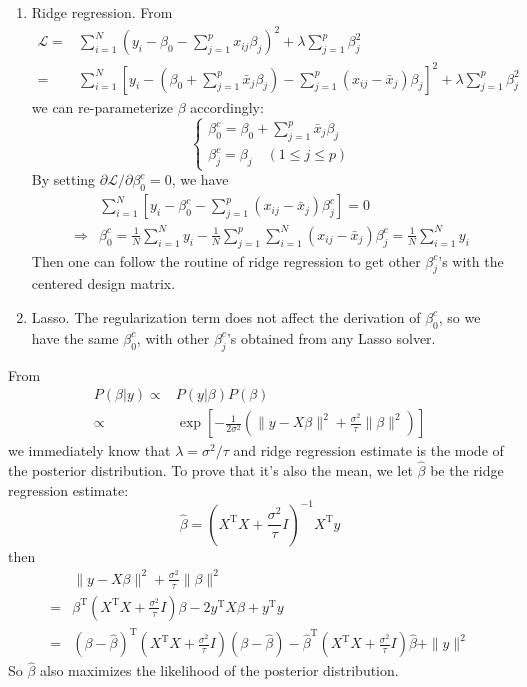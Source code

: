\begin{sol}
\begin{enumerate}
\item Ridge regression. From
\begin{align*}
\mathcal{L} =& \sum_{i=1}^{N}\left(y_i-\beta_0-\sum_{j=1}^{p}x_{ij}\beta_j\right)^2+\lambda\sum_{j=1}^{p}\beta_j^2\\
=& \sum_{i=1}^{N}\left[y_i-\left(\beta_0+\sum_{j=1}^{p}\bar{x}_j\beta_j\right)-\sum_{j=1}^{p}\left(x_{ij}-\bar{x}_j\right)\beta_j\right]^2+\lambda\sum_{j=1}^{p}\beta_j^2
\end{align*}
we can re-parameterize $\beta$ accordingly:
\[
\begin{cases}
\beta_0^c=\beta_0+\sum_{j=1}^{p}\bar{x}_j\beta_j\\
\beta_j^c=\beta_j\quad(1\le j\le p)
\end{cases}
\]
By setting $\partial \mathcal{L}/\partial \beta^c_0=0$, we have
\begin{align*}
& \sum_{i=1}^{N}\left[y_i-\beta_0^c-\sum_{j=1}^{p}\left(x_{ij}-\bar{x}_j\right)\beta^c_j\right]=0\\
\Longrightarrow & \beta_0^c=\frac{1}{N}\sum_{i=1}^{N}y_i-\frac{1}{N}\sum_{j=1}^{p}\sum_{i=1}^{N}\left(x_{ij}-\bar{x}_j\right)\beta^c_j=\frac{1}{N}\sum_{i=1}^{N}y_i
\end{align*}
Then one can follow the routine of ridge regression to get other $\beta_j^c$'s with the centered design matrix.
\item Lasso. The regularization term does not affect the derivation of $\beta_0^c$, so we have the same $\beta_0^c$, with other $\beta_j^c$'s obtained from any Lasso solver.
\end{enumerate}
\end{sol}

\begin{sol}
From
\begin{align*}
P(\beta\vert y) \propto & P(y\vert\beta)P(\beta)\\
\propto& \exp\left[-\frac{1}{2\sigma^2}\left(\|y-X\beta\|^2+\frac{\sigma^2}{\tau}\|\beta\|^2\right)\right]
\end{align*}
we immediately know that $\lambda=\sigma^2/\tau$ and ridge regression estimate is the mode of the posterior distribution. To prove that it's also the mean, we let $\hat{\beta}$ be the ridge regression estimate:
\[
\hat{\beta}=\left(X^\mathrm{T}X+\frac{\sigma^2}{\tau}I\right)^{-1}X^\mathrm{T}y
\]
then
\begin{align*}
& \|y-X\beta\|^2+\frac{\sigma^2}{\tau}\|\beta\|^2 \\
=& \beta^\mathrm{T}\left(X^\mathrm{T}X+\frac{\sigma^2}{\tau}I\right)\beta - 2y^\mathrm{T}X\beta + y^\mathrm{T}y\\
=& (\beta-\hat{\beta})^\mathrm{T}\left(X^\mathrm{T}X+\frac{\sigma^2}{\tau}I\right)(\beta-\hat{\beta})-\hat{\beta}^\mathrm{T}\left(X^\mathrm{T}X+\frac{\sigma^2}{\tau}I\right)\hat{\beta}+\|y\|^2
\end{align*}
So $\hat{\beta}$ also maximizes the likelihood of the posterior distribution.
\end{sol}
